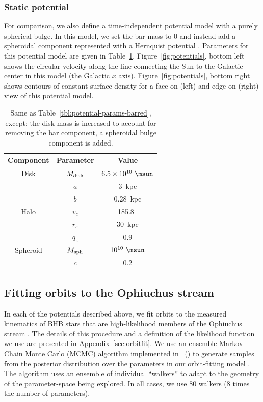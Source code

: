 \documentclass[letterpaper,12pt,preprint]{aastex}
\begin{document}
\subsubsection{Static potential}

For comparison, we also define a time-independent potential model with a purely spherical bulge. In this model, we set the bar mass to 0 and instead add a spheroidal component represented with a Hernquist potential \citep{hernquist90}. Parameters for this potential model are given in Table~\ref{tbl:potential-params-static}. Figure~\ref{fig:potentials}, bottom left shows the circular velocity along the line connecting the Sun to the Galactic center in this model (the Galactic $x$ axis). Figure~\ref{fig:potentials}, bottom right shows contours of constant surface density for a face-on (left) and edge-on (right) view of this potential model.

\begin{table}[ht]
\begin{center}
	\begin{tabular}{ c | c | c }
	         \toprule
	         Component & Parameter & Value \\\toprule
		Disk & $M_{\rm disk}$ & $6.5 \times 10^{10}~\msun$ \\
		& $a$ & 3~{\rm kpc}\\
		& $b$ & 0.28~{\rm kpc} \\\midrule
	         Halo & $v_c$ & 185.8~\kms\\
		& $r_s$ & 30~kpc \\
		& $q_z$ & 0.9 \\\midrule
		Spheroid & $M_{\rm sph}$ & $10^{10}~\msun$ \\
		& $c$ & 0.2 \\
		\bottomrule
		\end{tabular}
	\caption{Same as Table~\ref{tbl:potential-params-barred}, except: the disk mass is increased to account for removing the bar component, a spheroidal bulge component is added. \label{tbl:potential-params-static}}
\end{center}
\end{table}

\subsection{Fitting orbits to the Ophiuchus stream}

In each of the potentials described above, we fit orbits to the measured kinematics of BHB stars that are high-likelihood members of the Ophiuchus stream \citep{sesar15a, sesar15b}. The details of this procedure and a definition of the likelihood function we use are presented in Appendix~\ref{sec:orbitfit}. We use an ensemble Markov Chain Monte Carlo (MCMC) algorithm \citep{goodman10} implemented in \python\ () to generate samples from the posterior distribution over the parameters in our orbit-fitting model \citep{foremanmackey13}. The algorithm uses an ensemble of individual ``walkers'' to adapt to the geometry of the parameter-space being explored. In all cases, we use 80 walkers (8 times the number of parameters).
\end{document}
